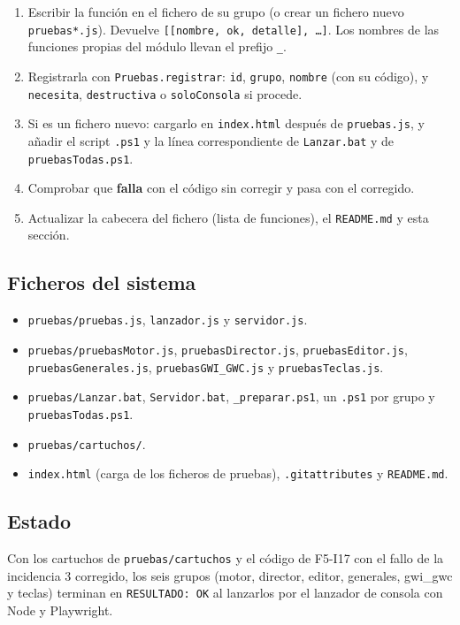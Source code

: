 \begin{enumerate}
	\item Escribir la función en el fichero de su grupo (o crear un fichero nuevo \texttt{pruebas*.js}). Devuelve \texttt{[[nombre, ok, detalle], \ldots]}. Los nombres de las funciones propias del módulo llevan el prefijo \texttt{\_}.
	\item Registrarla con \texttt{Pruebas.registrar}: \texttt{id}, \texttt{grupo}, \texttt{nombre} (con su código), y \texttt{necesita}, \texttt{destructiva} o \texttt{soloConsola} si procede.
	\item Si es un fichero nuevo: cargarlo en \texttt{index.html} después de \texttt{pruebas.js}, y añadir el script \texttt{.ps1} y la línea correspondiente de \texttt{Lanzar.bat} y de \texttt{pruebasTodas.ps1}.
	\item Comprobar que \textbf{falla} con el código sin corregir y pasa con el corregido.
	\item Actualizar la cabecera del fichero (lista de funciones), el \texttt{README.md} y esta sección.
\end{enumerate}

\subsection{Ficheros del sistema}
\label{sec:F5I18Ficheros}

\begin{itemize}
	\item \texttt{pruebas/pruebas.js}, \texttt{lanzador.js} y \texttt{servidor.js}.
	\item \texttt{pruebas/pruebasMotor.js}, \texttt{pruebasDirector.js}, \texttt{pruebasEditor.js}, \texttt{pruebasGenerales.js}, \texttt{pruebasGWI\_GWC.js} y \texttt{pruebasTeclas.js}.
	\item \texttt{pruebas/Lanzar.bat}, \texttt{Servidor.bat}, \texttt{\_preparar.ps1}, un \texttt{.ps1} por grupo y \texttt{pruebasTodas.ps1}.
	\item \texttt{pruebas/cartuchos/}.
	\item \texttt{index.html} (carga de los ficheros de pruebas), \texttt{.gitattributes} y \texttt{README.md}.
\end{itemize}

\subsection{Estado}
\label{sec:F5I18Estado}

Con los cartuchos de \texttt{pruebas/cartuchos} y el código de F5-I17 con el fallo de la incidencia 3 corregido, los seis grupos (motor, director, editor, generales, gwi\_gwc y teclas) terminan en \texttt{RESULTADO: OK} al lanzarlos por el lanzador de consola con Node y Playwright.
